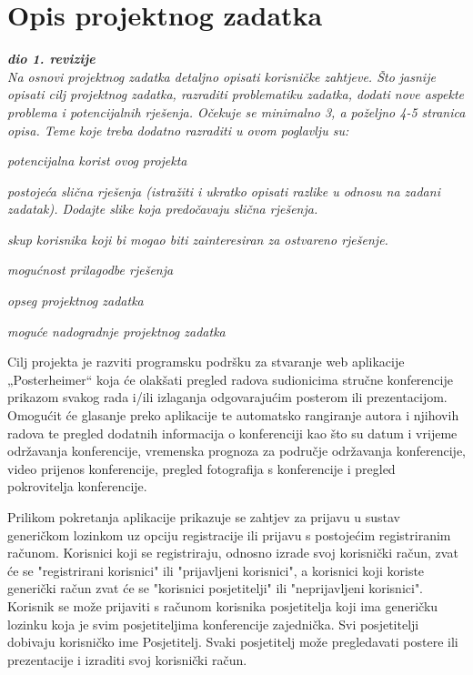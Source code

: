 \chapter{Opis projektnog zadatka}
		
		\textbf{\textit{dio 1. revizije}}\\
		
		\textit{Na osnovi projektnog zadatka detaljno opisati korisničke zahtjeve. Što jasnije opisati cilj projektnog zadatka, razraditi problematiku zadatka, dodati nove aspekte problema i potencijalnih rješenja. Očekuje se minimalno 3, a poželjno 4-5 stranica opisa. Teme koje treba dodatno razraditi u ovom poglavlju su:}
		\begin{packed_item}
			\item \textit{potencijalna korist ovog projekta}
			\item \textit{postojeća slična rješenja (istražiti i ukratko opisati razlike u odnosu na zadani zadatak). Dodajte slike koja predočavaju slična rješenja.}
			\item \textit{skup korisnika koji bi mogao biti zainteresiran za ostvareno rješenje.}
			\item \textit{mogućnost prilagodbe rješenja }
			\item \textit{opseg projektnog zadatka}
			\item \textit{moguće nadogradnje projektnog zadatka}
		\end{packed_item}
		
		Cilj projekta je razviti programsku podršku za stvaranje web aplikacije „Posterheimer“ koja će olakšati pregled radova sudionicima stručne konferencije prikazom svakog rada i/ili izlaganja odgovarajućim posterom ili prezentacijom. Omogućit će glasanje preko aplikacije te automatsko rangiranje autora i njihovih radova te pregled dodatnih informacija o konferenciji kao što su datum i vrijeme održavanja konferencije, vremenska prognoza za područje održavanja konferencije, video prijenos konferencije, pregled fotografija s konferencije i pregled pokrovitelja konferencije.
		
		Prilikom pokretanja aplikacije prikazuje se zahtjev za prijavu u sustav generičkom lozinkom uz opciju registracije ili prijavu s postojećim registriranim računom.
		Korisnici koji se registriraju, odnosno izrade svoj korisnički račun, zvat će se "registrirani korisnici" ili "prijavljeni korisnici", a korisnici koji koriste generički račun zvat će se "korisnici posjetitelji" ili "neprijavljeni korisnici". Korisnik se može prijaviti s računom korisnika posjetitelja koji ima generičku lozinku koja je svim posjetiteljima konferencije zajednička. Svi posjetitelji dobivaju korisničko ime Posjetitelj. Svaki posjetitelj može pregledavati postere ili prezentacije i izraditi svoj korisnički račun.
		
